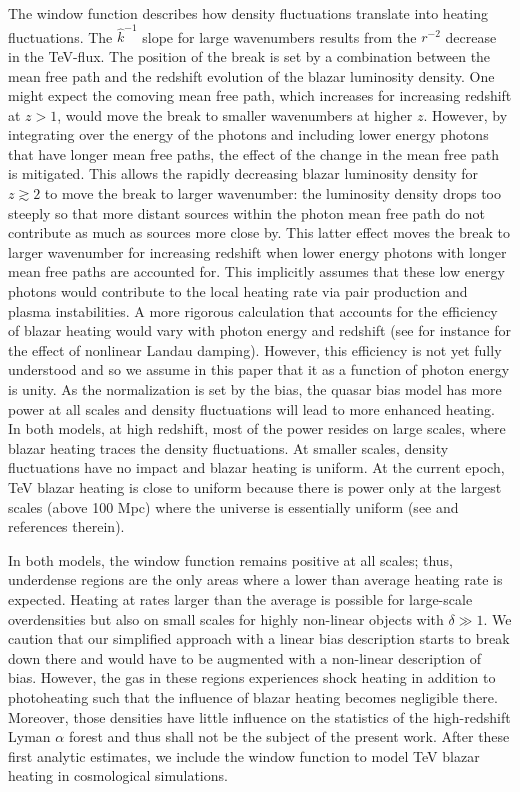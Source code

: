 \documentclass[numberedappendix]{emulateapj}
\begin{document}
The window function describes how density fluctuations translate into heating fluctuations.  The $\hat{k}^{-1}$ slope for large wavenumbers results from the $r^{-2}$ decrease in the TeV-flux. The position of the break is set by a combination between the mean free path and the redshift evolution of the blazar luminosity density. One might expect the comoving mean free path, which increases for increasing redshift at $z>1$, would move the break to smaller wavenumbers at higher $z$. However, by integrating over the energy of the photons and including lower energy photons that have longer mean free paths, the effect of the change in the mean free path is mitigated. This allows the rapidly decreasing blazar luminosity density for $z\gtrsim 2$ to move the break to larger wavenumber: the luminosity density drops too steeply so that more distant sources within the photon mean free path do not contribute as much as sources more close by. This latter effect moves the break to larger wavenumber for increasing redshift when lower energy photons with longer mean free paths are accounted for.  This implicitly assumes that these low energy photons would contribute to the local heating rate via pair production and plasma instabilities.  A more rigorous calculation that accounts for the efficiency of blazar heating would vary with photon energy and redshift (see for instance \citealt{2014ApJ...797..110C} for the effect of nonlinear Landau damping). However, this efficiency is not yet fully understood and so we assume in this paper that it as a function of photon energy is unity. As the normalization is set  by the bias, the quasar bias model has more power at all scales and density fluctuations will lead to more enhanced heating.  In  both models, at high redshift, most of the power resides on large scales, where blazar heating traces the density fluctuations. At smaller scales, density fluctuations have no impact and blazar heating is uniform. At the current epoch, TeV blazar heating is close to uniform because there is power only at the largest scales (above 100 Mpc) where the universe is essentially uniform (see \citet{2013MNRAS.429.2910C} and references therein).

In both models, the window function remains positive at all scales; thus, underdense regions are the only areas where a lower than average heating rate is expected. Heating at rates larger than the average is possible for large-scale overdensities but also on small scales for highly non-linear objects with $\delta\gg1$. We caution that our simplified approach with a linear bias description starts to break down there and would have to be augmented with a non-linear description of bias. However, the gas in these regions experiences shock heating in addition to photoheating such that the influence of blazar heating becomes negligible there. Moreover, those densities have little influence on the statistics of the high-redshift Lyman $\alpha$ forest and thus shall not be the subject of the present work. After these first analytic estimates, we include the window function to model TeV blazar heating in cosmological simulations.
\end{document}

